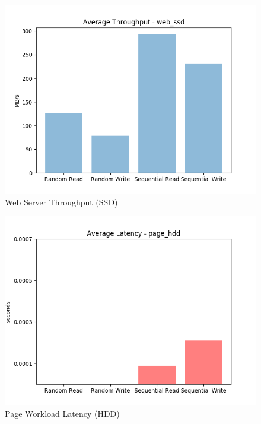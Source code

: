 \documentclass[10pt, author, twocolumn]{article}
\begin{document}
\begin{figure}[h!]
    \includegraphics[scale=0.5]{../graphs/web_ssd-thru.png}
    \caption{Web Server Throughput (SSD)}
    \label{fig:ssd_web_thru}
\end{figure}

\begin{figure}[h!]
    \includegraphics[scale=0.5]{../graphs/page_hdd-lat.png}
    \caption{Page Workload Latency (HDD)}
    \label{fig:hdd_page_lat}
\end{figure}
\end{document}
